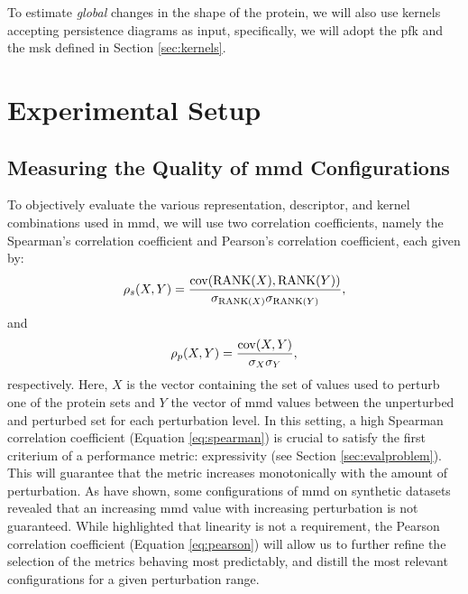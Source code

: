 To estimate \emph{global} changes in the shape of the protein, we will also use
kernels accepting persistence diagrams as input, specifically, we will adopt the
\gls{pfk} \citep{le2018persistence} and the \gls{msk}
\citep{reininghaus2015stable} defined in Section \ref{sec:kernels}.


\section{Experimental Setup}

\subsection{Measuring the Quality of \gls{mmd} Configurations}

To objectively evaluate the various representation, descriptor, and kernel
combinations used in \gls{mmd}, we will use two correlation coefficients, namely the
Spearman's correlation coefficient and Pearson's correlation coefficient, each
given by:
\begin{equation}
  \label{eq:spearman} \rho_s(X,Y) = {\mathrm{cov}(\mathrm{RANK}(X), \mathrm{RANK}(Y)) \over
\sigma_{\mathrm{RANK}(X)}\sigma_{\mathrm{RANK}(Y)}},
\end{equation} and
\begin{equation}
  \label{eq:pearson} \rho_p(X,Y) = {\mathrm{cov}(X, Y)\over \sigma_X\sigma_Y},
\end{equation}
respectively. Here, $X$ is the vector containing the set of values used to
perturb one of the protein sets and $Y$ the vector of \gls{mmd} values
between the unperturbed and perturbed set for each perturbation level. In this
setting, a high Spearman correlation coefficient (Equation \ref{eq:spearman}) is
crucial to satisfy the first criterium of a performance metric: expressivity
(see Section \ref{sec:evalproblem}). This will guarantee that the metric
increases monotonically with the amount of perturbation. As
\cite{obray2022evaluation} have shown, some configurations of \gls{mmd} on
synthetic datasets revealed that an increasing \gls{mmd} value with
increasing perturbation is not guaranteed. While \cite{thompson2022evaluation}
highlighted that linearity is not a requirement, the Pearson correlation
coefficient (Equation \ref{eq:pearson}) will allow us to further refine the
selection of the metrics behaving most predictably, and distill the most
relevant configurations for a given perturbation range.

